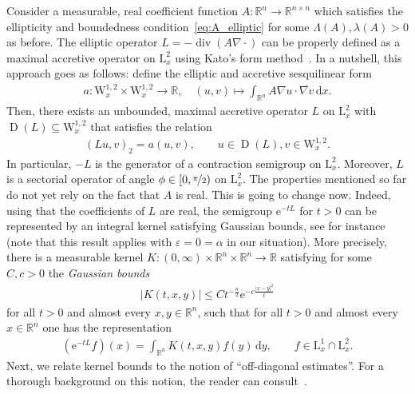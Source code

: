 \documentclass[11pt, leqno]{amsart}
\theoremstyle{definition}
\newcommand{\R}{\mathbb{R}}
\renewcommand{\L}{\mathrm{L}}
\newcommand{\W}{\mathrm{W}}
\newcommand{\e}{\mathrm{e}}
\renewcommand{\d}{\,\mathrm{d}}
\newcommand{\eps}{\varepsilon}
\DeclareMathOperator{\dom}{D}
\DeclareMathOperator{\Div}{div}
\begin{document}
	Consider a measurable, real coefficient function $A \colon \R^n \to \R^{n\times n}$ which satisfies the ellipticity and boundedness condition~\eqref{eq:A_elliptic} for some $\Lambda{(A)}, \lambda{(A)} > 0$ as before.
	The elliptic operator $L = -\Div(A\nabla \cdot)$ can be properly defined as a maximal accretive operator on $\L^2_x$ using Kato's form method~\cite{Kato}. In a nutshell, this approach goes as follows: define the elliptic and accretive sesquilinear form
	\begin{align}
		a \colon \W^{1,2}_x \times \W^{1,2}_x \to \R, \quad (u,v) \mapsto \int_{\R^n} A\nabla u \cdot \overline{\nabla v} \d x.
	\end{align}
	Then, there exists an unbounded, maximal accretive operator $L$ on $\L^2_x$ with $\dom(L) \subseteq \W^{1,2}_x$ that satisfies the relation
	\begin{align}
		(Lu, v)_2 = a(u,v), \qquad u\in \dom(L), v\in \W^{1,2}_x.
	\end{align}
	In particular, $-L$ is the generator of a contraction semigroup on $\L^2_x$. Moreover, $L$ is a sectorial operator of angle $\phi \in [0,\nicefrac{\pi}{2})$ on $\L^2_x$. The properties mentioned so far do not yet rely on the fact that $A$ is real. This is going to change now. Indeed, using that the coefficients of $L$ are real, the semigroup $\e^{-tL}$ for $t>0$ can be represented by an integral kernel satisfying Gaussian bounds, see for instance~\cite[Thm.~6.11]{Ouhabaz} (note that this result applies with $\eps = 0 = \alpha$ in our situation). More precisely, there is a measurable kernel $K \colon (0,\infty) \times \R^n \times \R^n \to \R$ satisfying for some $C,c > 0$ the \emph{Gaussian bounds}
	\begin{align}
		|K(t,x,y)| \leq C t^{-\frac{n}{2}} \e^{-c\frac{|x-y|^2}{t}}
	\end{align}
	for all $t > 0$ and almost every $x,y \in \R^n$, such that for all $t>0$ and almost every $x\in \R^n$ one has the representation
	\begin{align}
		(\e^{-tL} f)(x) = \int_{\R^n} K(t,x,y) f(y) \d y, \qquad f \in \L^1_x \cap \L^2_x.
	\end{align}
	Next, we relate kernel bounds to the notion of \enquote{off-diagonal estimates}. For a thorough background on this notion, the reader can consult~\cite{Memoirs}.
\end{document}
